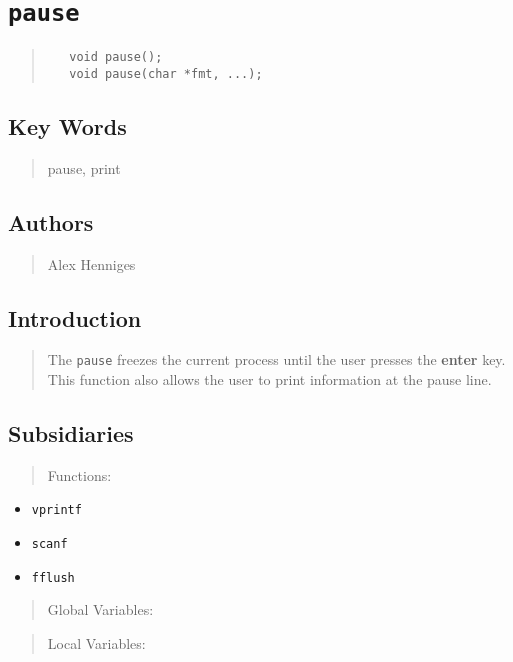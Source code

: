 \documentclass[10pt]{article}%
\begin{document}

\section*{\texttt{pause}}

\label{f0}\begin{quotation} {\small{\begin{verbatim} 
   void pause();
   void pause(char *fmt, ...);
   \end{verbatim}
}}
\end{quotation}
\subsection*{Key Words}

\begin{quotation} pause, print\end{quotation}

\subsection*{Authors}

\begin{quotation} Alex Henniges\end{quotation}

\subsection*{Introduction}

\begin{quotation} The \texttt{pause} freezes the current process until the user presses the \textbf{enter} key. This function also allows the user to print information at the pause line.\end{quotation}

\subsection*{Subsidiaries}

\begin{quotation} Functions:\end{quotation}
\begin{itemize}
\item  \texttt{vprintf}
\item  \texttt{scanf}
\item  \texttt{fflush}
\end{itemize}
\begin{quotation} Global Variables:\end{quotation}
\begin{quotation} Local Variables:\end{quotation}
\end{document}
